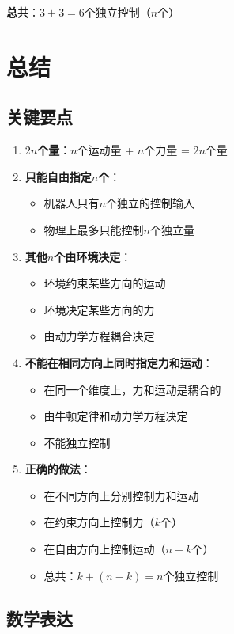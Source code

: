 \documentclass[12pt,a4paper]{article}
\begin{document}
\textbf{总共}：$3 + 3 = 6$个独立控制（$n$个）

\section{总结}

\subsection{关键要点}

\begin{enumerate}
\item \textbf{$2n$个量}：$n$个运动量 + $n$个力量 = $2n$个量

\item \textbf{只能自由指定$n$个}：
\begin{itemize}
\item 机器人只有$n$个独立的控制输入
\item 物理上最多只能控制$n$个独立量
\end{itemize}

\item \textbf{其他$n$个由环境决定}：
\begin{itemize}
\item 环境约束某些方向的运动
\item 环境决定某些方向的力
\item 由动力学方程耦合决定
\end{itemize}

\item \textbf{不能在相同方向上同时指定力和运动}：
\begin{itemize}
\item 在同一个维度上，力和运动是耦合的
\item 由牛顿定律和动力学方程决定
\item 不能独立控制
\end{itemize}

\item \textbf{正确的做法}：
\begin{itemize}
\item 在不同方向上分别控制力和运动
\item 在约束方向上控制力（$k$个）
\item 在自由方向上控制运动（$n-k$个）
\item 总共：$k + (n-k) = n$个独立控制
\end{itemize}
\end{enumerate}

\subsection{数学表达}
\end{document}
